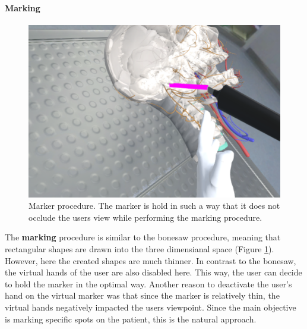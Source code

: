 \paragraph{Marking}

\begin{figure}[ht]
    \centering
    \includegraphics[width=\linewidth]{images/implementation/features/procedures/marker.png}
    \caption{\label{fig::FeatureMarker}Marker procedure. The marker is hold in such a way that it does not occlude the users view while performing the marking procedure.}
\end{figure}

The \textbf{marking} procedure is similar to the bonesaw procedure, meaning that rectangular shapes are drawn into the three dimensianal space (Figure \ref{fig::FeatureMarker}).
However, here the created shapes are much thinner.
In contrast to the bonesaw, the virtual hands of the user are also disabled here.
This way, the user can decide to hold the marker in the optimal way.
Another reason to deactivate the user's hand on the virtual marker was that since the marker is relatively thin, the virtual hands negatively impacted the users viewpoint.
Since the main objective is marking specific spots on the patient, this is the natural approach.